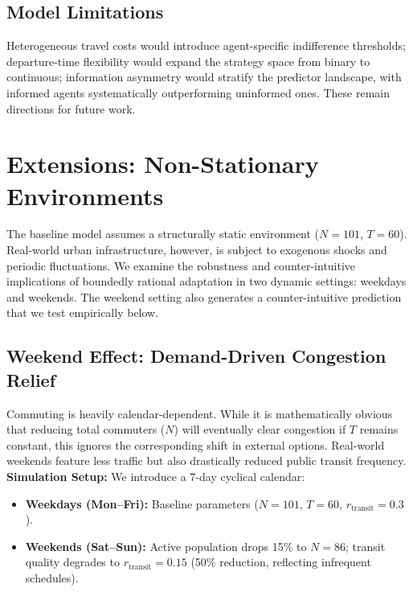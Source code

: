 \subsection{Model Limitations}

Heterogeneous travel costs would introduce agent-specific indifference thresholds; departure-time flexibility would expand the strategy space from binary to continuous; information asymmetry would stratify the predictor landscape, with informed agents systematically outperforming uninformed ones. These remain directions for future work. \\

\section{Extensions: Non-Stationary Environments}

The baseline model assumes a structurally static environment ($N=101$, $T=60$). Real-world urban infrastructure, however, is subject to exogenous shocks and periodic fluctuations. We examine the robustness and counter-intuitive implications of boundedly rational adaptation in two dynamic settings: weekdays and weekends. The weekend setting also generates a counter-intuitive prediction that we test empirically below.  \\

\subsection{Weekend Effect: Demand-Driven Congestion Relief}

Commuting is heavily calendar-dependent. While it is mathematically obvious that reducing total commuters ($N$) will eventually clear congestion if $T$ remains constant, this ignores the corresponding shift in external options. Real-world weekends feature less traffic but also drastically reduced public transit frequency. \\

\textbf{Simulation Setup:} We introduce a 7-day cyclical calendar: \\

\begin{itemize}
    \item \textbf{Weekdays (Mon--Fri):} Baseline parameters ($N=101$, $T=60$, $r_{\text{transit}} = 0.3$).
    \item \textbf{Weekends (Sat--Sun):} Active population drops 15\% to $N=86$; transit quality degrades to $r_{\text{transit}} = 0.15$ (50\% reduction, reflecting infrequent schedules).
\end{itemize}

